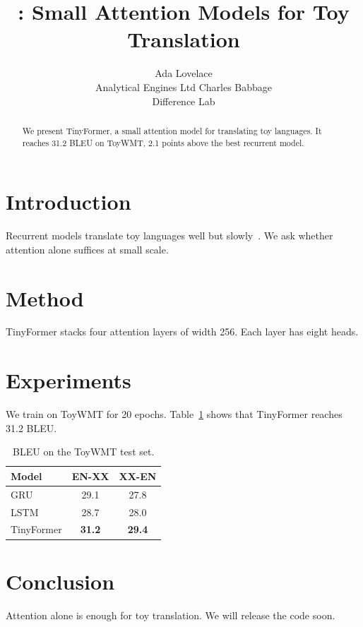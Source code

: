 \documentclass{article}
\title{\method: Small Attention Models for Toy Translation}
\author{Ada Lovelace \\ Analytical Engines Ltd \And Charles Babbage \\ Difference Lab}
\newcommand{\method}{TinyFormer}
\begin{document}
\maketitle
\begin{abstract}
We present \method, a small attention model for translating toy languages.
It reaches 31.2 BLEU on ToyWMT, 2.1 points above the best recurrent model.
\end{abstract}

\section{Introduction}
Recurrent models translate toy languages well but slowly~\cite{elman1990}.
We ask whether attention alone suffices at small scale.

\section{Method}
\method{} stacks four attention layers of width 256.
Each layer has eight heads.

\section{Experiments}
We train on ToyWMT for 20 epochs.
Table~\ref{tab:main} shows that \method{} reaches 31.2 BLEU.

\begin{table}[t]
\centering
\caption{BLEU on the ToyWMT test set.}\label{tab:main}
\begin{tabular}{lcc}
\toprule
Model & EN-XX & XX-EN \\
\midrule
GRU & 29.1 & 27.8 \\
LSTM & 28.7 & 28.0 \\
\method{} & \textbf{31.2} & \textbf{29.4} \\
\bottomrule
\end{tabular}
\end{table}

\section{Conclusion}
Attention alone is enough for toy translation.
We will release the code soon.



\end{document}
